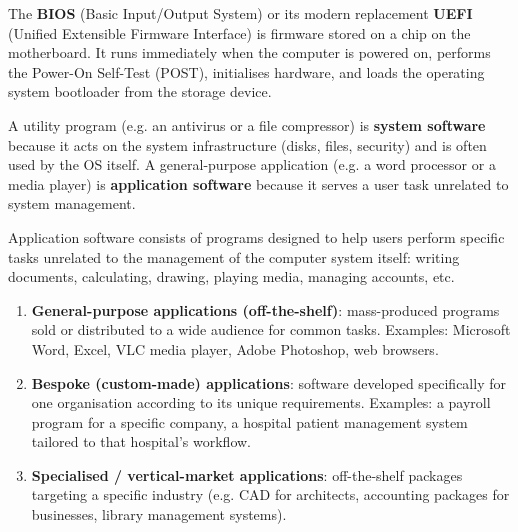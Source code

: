 \documentclass[11pt]{article}
\newcounter{popsec}
\newcounter{popsub}
\newcommand{\courssub}[1]{%
  \stepcounter{popsub}%
  \par\vspace{9pt}\noindent{\popxbold\fontsize{11.5}{13}\selectfont\color{popink}{\color{poporange}\thepopsec.\thepopsub}\hspace{6pt}#1}\par\nopagebreak\vspace{4pt}
}
\begin{document}
\begin{exemplebox}
The \textbf{BIOS} (Basic Input/Output System) or its modern replacement \textbf{UEFI} (Unified Extensible Firmware Interface) is firmware stored on a chip on the motherboard. It runs immediately when the computer is powered on, performs the Power-On Self-Test (POST), initialises hardware, and loads the operating system bootloader from the storage device.
\end{exemplebox}

\begin{attention}
A utility program (e.g. an antivirus or a file compressor) is \textbf{system software} because it acts on the system infrastructure (disks, files, security) and is often used by the OS itself. A general-purpose application (e.g. a word processor or a media player) is \textbf{application software} because it serves a user task unrelated to system management.
\end{attention}

\courssub{Application software}

\begin{definition}
Application software consists of programs designed to help users perform specific tasks unrelated to the management of the computer system itself: writing documents, calculating, drawing, playing media, managing accounts, etc.
\end{definition}

\begin{propriete}
\begin{enumerate}
\item \textbf{General-purpose applications (off-the-shelf)}: mass-produced programs sold or distributed to a wide audience for common tasks. Examples: Microsoft Word, Excel, VLC media player, Adobe Photoshop, web browsers.
\item \textbf{Bespoke (custom-made) applications}: software developed specifically for one organisation according to its unique requirements. Examples: a payroll program for a specific company, a hospital patient management system tailored to that hospital's workflow.
\item \textbf{Specialised / vertical-market applications}: off-the-shelf packages targeting a specific industry (e.g. CAD for architects, accounting packages for businesses, library management systems).
\end{enumerate}
\end{propriete}
\end{document}
